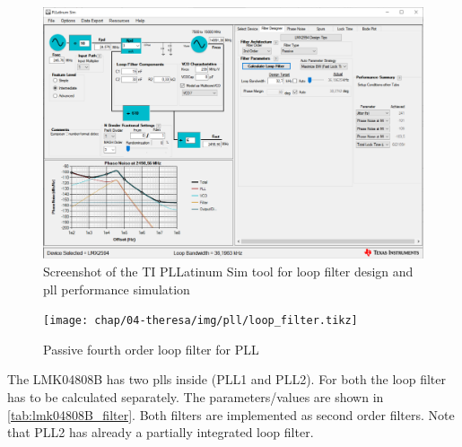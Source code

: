 \begin{figure}[tbh]
	\centering
	\includegraphics[width = \textwidth]{chap/04-theresa/img/pll/pll.PNG}
	\caption[PLL block diagram]{Screenshot of the TI PLLatinum Sim tool for loop filter design and \gls{pll} performance simulation}
	\label{fig:ti_pll}
\end{figure}


\begin{figure}[tbh]
	\centering
	\tikzexternaldisable
	\texttt{[image: chap/04-theresa/img/pll/loop\_filter.tikz]}
	\caption[PLL loop filter components]{Passive fourth order loop filter for PLL}
	\tikzexternalenable
	\label{fig:loop_filter}
\end{figure}

The LMK04808B has two \glspl{pll} inside (PLL1 and PLL2).
For both the loop filter has to be calculated separately. 
The parameters/values are shown in \autoref{tab:lmk04808B_filter}.
Both filters are implemented as second order filters. 
Note that PLL2 has already a partially integrated loop filter.

